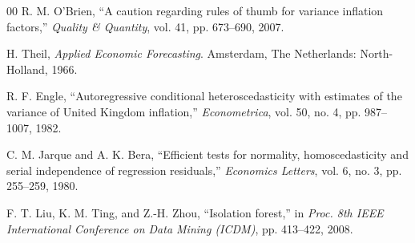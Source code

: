 \documentclass[conference]{IEEEtran}
\begin{document}
\begin{thebibliography}{00}
R. M. O'Brien, ``A caution regarding rules of thumb for variance inflation factors,'' \textit{Quality \& Quantity}, vol. 41, pp. 673--690, 2007.

H. Theil, \textit{Applied Economic Forecasting}. Amsterdam, The Netherlands: North-Holland, 1966.

R. F. Engle, ``Autoregressive conditional heteroscedasticity with estimates of the variance of United Kingdom inflation,'' \textit{Econometrica}, vol. 50, no. 4, pp. 987--1007, 1982.

C. M. Jarque and A. K. Bera, ``Efficient tests for normality, homoscedasticity and serial independence of regression residuals,'' \textit{Economics Letters}, vol. 6, no. 3, pp. 255--259, 1980.

F. T. Liu, K. M. Ting, and Z.-H. Zhou, ``Isolation forest,'' in \textit{Proc. 8th IEEE International Conference on Data Mining (ICDM)}, pp. 413--422, 2008.

\end{thebibliography}
\end{document}

